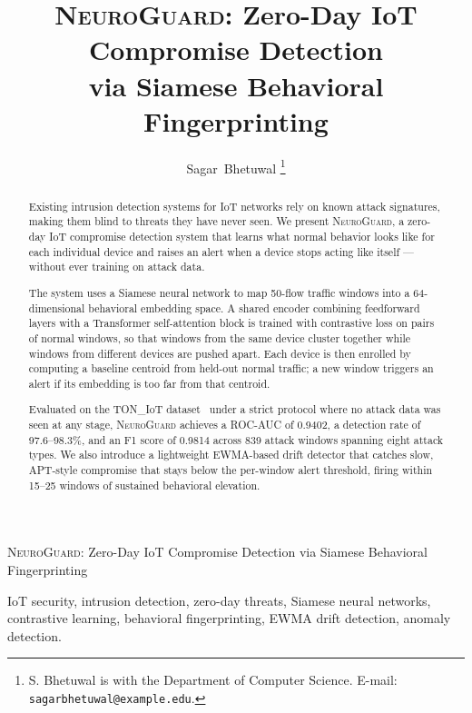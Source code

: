 \documentclass[journal,10pt,twoside]{IEEEtran}
\newcommand{\neuroguard}{\textsc{NeuroGuard}}
\begin{document}
\title{\neuroguard: Zero-Day IoT Compromise Detection\\
       via Siamese Behavioral Fingerprinting}

\author{Sagar~Bhetuwal%
  \thanks{S. Bhetuwal is with the Department of Computer Science.
          E-mail: \texttt{sagarbhetuwal@example.edu}.}
\IEEEmembership{}
}

%
         {\neuroguard{}: Zero-Day IoT Compromise Detection via Siamese
          Behavioral Fingerprinting}

\maketitle

\begin{abstract}
Existing intrusion detection systems for IoT networks rely on known attack
signatures, making them blind to threats they have never seen.
We present \neuroguard{}, a zero-day IoT compromise detection system that
learns what normal behavior looks like for each individual device and raises
an alert when a device stops acting like itself --- without ever training on
attack data.

The system uses a Siamese neural network to map 50-flow traffic windows
into a 64-dimensional behavioral embedding space. A shared encoder
combining feedforward layers with a Transformer self-attention block
is trained with contrastive loss on pairs of normal windows, so that windows
from the same device cluster together while windows from different devices
are pushed apart. Each device is then enrolled by computing a baseline
centroid from held-out normal traffic; a new window triggers an alert if its
embedding is too far from that centroid.

Evaluated on the TON\_IoT dataset~\cite{alsaedi2020toniot} under a
strict protocol where no attack data was seen at any stage, \neuroguard{}
achieves a ROC-AUC of 0.9402, a detection rate of 97.6--98.3\%, and
an F1 score of 0.9814 across 839 attack windows spanning eight attack types.
We also introduce a lightweight EWMA-based drift detector that catches
slow, APT-style compromise that stays below the per-window alert threshold,
firing within 15--25 windows of sustained behavioral elevation.
\end{abstract}

\begin{IEEEkeywords}
IoT security, intrusion detection, zero-day threats, Siamese neural networks,
contrastive learning, behavioral fingerprinting, EWMA drift detection,
anomaly detection.
\end{IEEEkeywords}
\end{document}
